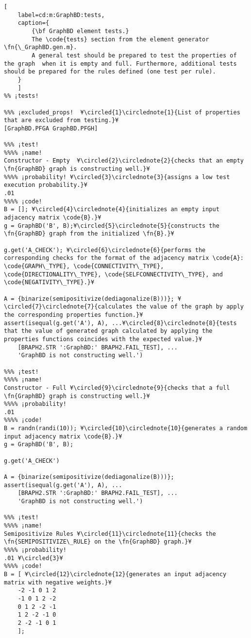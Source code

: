 \documentclass{tufte-handout}
\begin{document}
\clearpage

\begin{lstlisting}[
	label=cd:m:GraphBD:tests,
	caption={
		{\bf GraphBD element tests.}
		The \code{tests} section from the element generator \fn{\_GraphBD.gen.m}.
		A general test should be prepared to test the properties of the graph  when it is empty and full. Furthermore, additional tests should be prepared for the rules defined (one test per rule).
	}
	]			
%% ¡tests!

%%% ¡excluded_props!  ¥\circled{1}\circlednote{1}{List of properties that are excluded from testing.}¥
[GraphBD.PFGA GraphBD.PFGH]

%%% ¡test!
%%%% ¡name!
Constructor - Empty  ¥\circled{2}\circlednote{2}{checks that an empty \fn{GraphBD} graph is constructing well.}¥
%%%% ¡probability! ¥\circled{3}\circlednote{3}{assigns a low test execution probability.}¥
.01
%%%% ¡code!
B = []; ¥\circled{4}\circlednote{4}{initializes an empty input adjacency matrix \code{B}.}¥
g = GraphBD('B', B);¥\circled{5}\circlednote{5}{constructs the \fn{GraphBD} graph from the initialized \fn{B}.}¥

g.get('A_CHECK'); ¥\circled{6}\circlednote{6}{performs the corresponding checks for the format of the adjacency matrix \code{A}: \code{GRAPH\_TYPE}, \code{CONNECTIVITY\_TYPE}, \code{DIRECTIONALITY\_TYPE}, \code{SELFCONNECTIVITY\_TYPE}, and \code{NEGATIVITY\_TYPE}.}¥

A = {binarize(semipositivize(dediagonalize(B)))}; ¥\circled{7}\circlednote{7}{calculates the value of the graph by apply the corresponding properties function.}¥
assert(isequal(g.get('A'), A), ...¥\circled{8}\circlednote{8}{tests that the value of generated graph calculated by applying the properties functions coincides with the expected value.}¥
	[BRAPH2.STR ':GraphBD:' BRAPH2.FAIL_TEST], ...
	'GraphBD is not constructing well.')

%%% ¡test!
%%%% ¡name!
Constructor - Full ¥\circled{9}\circlednote{9}{checks that a full \fn{GraphBD} graph is constructing well.}¥
%%%% ¡probability!
.01
%%%% ¡code!
B = randn(randi(10)); ¥\circled{10}\circlednote{10}{generates a random input adjacency matrix \code{B}.}¥
g = GraphBD('B', B);

g.get('A_CHECK')

A = {binarize(semipositivize(dediagonalize(B)))};
assert(isequal(g.get('A'), A), ...
	[BRAPH2.STR ':GraphBD:' BRAPH2.FAIL_TEST], ...
	'GraphBD is not constructing well.')

%%% ¡test!
%%%% ¡name!
Semipositivize Rules ¥\circled{11}\circlednote{11}{checks the \fn{SEMIPOSITIVIZE\_RULE} on the \fn{GraphBD} graph.}¥
%%%% ¡probability!
.01 ¥\circled{3}¥
%%%% ¡code!
B = [ ¥\circled{12}\circlednote{12}{generates an input adjacency matrix with negative weights.}¥
	-2 -1 0 1 2
	-1 0 1 2 -2
	0 1 2 -2 -1
	1 2 -2 -1 0
	2 -2 -1 0 1
	];


\end{lstlisting}
\end{document}
